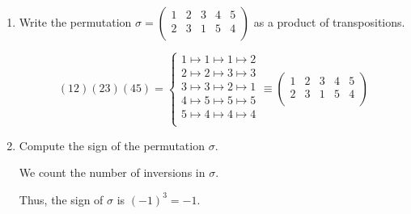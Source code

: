 \documentclass{article}
\begin{document}
\begin{problem}
\begin{enumerate}[label=\bfalph]
	\item Write the permutation $\sigma = \begin{pmatrix}
			      1 & 2 & 3 & 4 & 5 \\
			      2 & 3 & 1 & 5 & 4 \\
		      \end{pmatrix}$ as a product of transpositions.
	      \begin{solution}
		      \[
			      (1 2)(2 3)(4 5) = \left\{\begin{aligned}
				      1 \mapsto 1 \mapsto 1 \mapsto 2 \\
				      2 \mapsto 2 \mapsto 3 \mapsto 3 \\
				      3 \mapsto 3 \mapsto 2 \mapsto 1 \\
				      4 \mapsto 5 \mapsto 5 \mapsto 5 \\
				      5 \mapsto 4 \mapsto 4 \mapsto 4 \\
			      \end{aligned}\right. \equiv \begin{pmatrix}
				      1 & 2 & 3 & 4 & 5 \\
				      2 & 3 & 1 & 5 & 4 \\
			      \end{pmatrix}
		      \]
	      \end{solution}

	\item Compute the sign of the permutation $\sigma$.
	      \begin{solution}
		      We count the number of inversions in $\sigma$.
		      \begin{center}
		      \end{center}
		      Thus, the sign of $\sigma$ is $(-1)^3 = -1$.
	      \end{solution}
\end{enumerate}
\end{problem}
\end{document}
